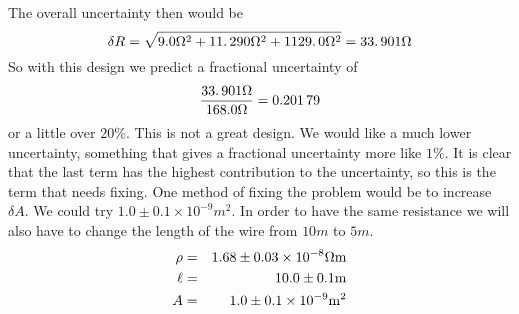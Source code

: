 The overall uncertainty then would be%
\begin{equation*}
\delta R=\sqrt{9.0\unit{%
\Omega%
}^{2}+11.\,\allowbreak 290\unit{%
\Omega%
}^{2}+1129.\,\allowbreak 0\unit{%
\Omega%
}^{2}}=33.\,\allowbreak 901\unit{%
\Omega%
}
\end{equation*}%
So with this design we predict a fractional uncertainty of 
\begin{equation*}
\frac{33.\,\allowbreak 901\unit{%
\Omega%
}}{168.0\unit{%
\Omega%
}}=0.201\,79
\end{equation*}%
or a little over $20\%.$ This is not a great design. We would like a much
lower uncertainty, something that gives a fractional uncertainty more like $%
1\%.$ It is clear that the last term has the highest contribution to the
uncertainty, so this is the term that needs fixing. One method of fixing the
problem would be to increase $\delta A.$ We could try $1.0\pm 0.1\times
10^{-9}\unit{m}^{2}.$ In order to have the same resistance we will also have
to change the length of the wire from $10\unit{m}$ to $5\unit{m}$. 
\begin{eqnarray*}
\rho &=&1.68\pm 0.03\times 10^{-8}\unit{%
\Omega%
}\unit{m} \\
\ell &=&10.0\pm 0.1\unit{m} \\
A &=&1.0\pm 0.1\times 10^{-9}\unit{m}^{2}
\end{eqnarray*}

